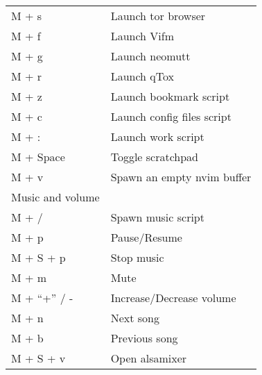 \documentclass{article}
\begin{document}
\begin{center}
\begin{tabular}{|l|l|}
		M + s & Launch tor browser\\
		M + f & Launch Vifm\\
		M + g & Launch neomutt\\
		M + r & Launch qTox\\
		M + z & Launch bookmark script\\
		M + c & Launch config files script\\
		M + : & Launch work script\\
		M + Space & Toggle scratchpad\\
		M + v & Spawn an empty nvim buffer\\
		\hline
		Music and volume&\\
		\hline
		M + / & Spawn music script\\
		M + p & Pause/Resume\\
		M + S + p & Stop music\\
		M + m & Mute\\
		M + ``+'' / - & Increase/Decrease volume\\
		M + n & Next song\\
		M + b & Previous song\\
	M + S + v & Open alsamixer\\
	\hline
\end{tabular}
\end{center}
\end{document}
